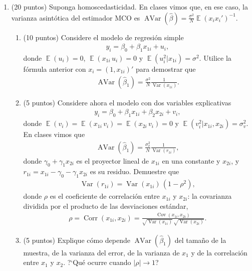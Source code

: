 \documentclass[letterpaper,11pt]{article}
\theoremstyle{plain}
\theoremstyle{definition}
\theoremstyle{remark}
\DeclareMathOperator{\Var}{Var}
\DeclareMathOperator{\Avar}{AVar}
\DeclareMathOperator{\Cov}{Cov}
\DeclareMathOperator{\E}{\mathbb{E}}
\DeclareMathOperator{\Corr}{Corr}
\begin{document}
\begin{enumerate}

    \item (20 puntos) Suponga homoscedasticidad. En clases vimos que, en ese caso, la varianza
        asint\'otica del estimador MCO es $\Avar(\hat \beta)=\frac{\sigma^2}{N}\E(x_ix_i')^{-1}$.
        \begin{enumerate}
            \item (10 puntos) Considere el modelo de regresi\'on simple
                \begin{align*}
                y_i=\beta_0+\beta_1 x_{1i}+u_i,
                \end{align*}
                donde $\E(u_i)=0$, $\E(x_{1i}\, u_i)=0$ y $\E(u_i^2|x_{1i})=\sigma^2$. Utilice la
                f\'ormula anterior con $x_i=(1, x_{1i})'$ para demostrar que
                \begin{align*}
                \Avar(\hat \beta_1)=\frac{\sigma^2}{N}\frac{1}{\Var(x_{1i})}.
                \end{align*}
            \item (5 puntos) Considere ahora el modelo con dos variables explicativas
                \begin{align*}
                y_i=\beta_0+\beta_1 x_{1i}+\beta_2 x_{2i}+v_i,
                \end{align*}
                donde $\E(v_i)=\E(x_{1i}\,v_i)=\E(x_{2i}\,v_i)=0$ y
                $\E(v_i^2|x_{1i},x_{2i})=\sigma_v^2$. En clases vimos que
                \begin{align*}
                \Avar(\hat \beta_1)=\frac{\sigma_v^2}{N}\frac{1}{\Var(r_{1i})},
                \end{align*}
                donde $\gamma_0+\gamma_1x_{2i}$ es el proyector lineal de $x_{1i}$ en una
                constante y $x_{2i}$, y $r_{1i}=x_{1i}-\gamma_0-\gamma_1x_{2i}$ es su residuo.
                Demuestre que
                \begin{align*}
                \Var(r_{1i})=\Var(x_{1i})\,(1-\rho^2),
                \end{align*}
                donde $\rho$ es el coeficiente de correlaci\'on entre $x_{1i}$ y $x_{2i}$: la
                covarianza dividida por el producto de las desviaciones est\'andar,
                \begin{align*}
                \rho=\Corr(x_{1i},x_{2i})=\frac{\Cov(x_{1i},x_{2i})}{\sqrt{\Var(x_{1i})}\,\sqrt{\Var(x_{2i})}}.
                \end{align*}
            \item (5 puntos) Explique c\'omo depende $\Avar(\hat \beta_1)$ del tama\~no de la
                muestra, de la varianza del error, de la varianza de $x_1$ y de la correlaci\'on
                entre $x_1$ y $x_2$. ?`Qu\'e ocurre cuando $|\rho|\to 1$?
        \end{enumerate}


\end{enumerate}
\end{document}
